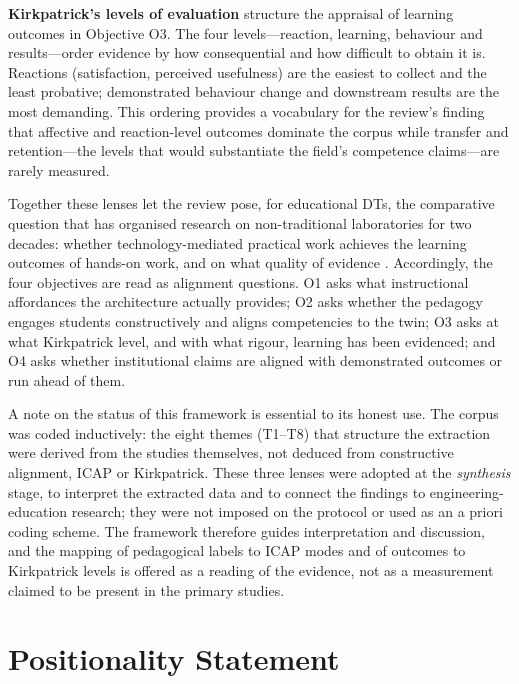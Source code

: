 \textbf{Kirkpatrick's levels of evaluation} \citep{kirkpatrick_kirkpatricks_2016} structure
the appraisal of learning outcomes in Objective O3. The four levels---reaction,
learning, behaviour and results---order evidence by how consequential and how
difficult to obtain it is. Reactions (satisfaction, perceived usefulness) are
the easiest to collect and the least probative; demonstrated behaviour change and
downstream results are the most demanding. This ordering provides a vocabulary
for the review's finding that affective and reaction-level outcomes dominate the
corpus while transfer and retention---the levels that would substantiate the
field's competence claims---are rarely measured.

Together these lenses let the review pose, for educational DTs, the comparative
question that has organised research on non-traditional laboratories for two
decades: whether technology-mediated practical work achieves the learning
outcomes of hands-on work, and on what quality of evidence \citep{ma_handson_2006, brinson_learning_2015}. Accordingly, the four objectives are read as alignment
questions. O1 asks what instructional affordances the architecture actually
provides; O2 asks whether the pedagogy engages students constructively and aligns
competencies to the twin; O3 asks at what Kirkpatrick level, and with what rigour,
learning has been evidenced; and O4 asks whether institutional claims are aligned
with demonstrated outcomes or run ahead of them.

A note on the status of this framework is essential to its honest use. The corpus
was coded inductively: the eight themes (T1--T8) that structure the extraction
were derived from the studies themselves, not deduced from constructive
alignment, ICAP or Kirkpatrick. These three lenses were adopted at the
\emph{synthesis} stage, to interpret the extracted data and to connect the findings to
engineering-education research; they were not imposed on the protocol or used as
an a priori coding scheme. The framework therefore guides interpretation and
discussion, and the mapping of pedagogical labels to ICAP modes and of outcomes
to Kirkpatrick levels is offered as a reading of the evidence, not as a
measurement claimed to be present in the primary studies.

\section{Positionality Statement}\label{positionality-statement}

